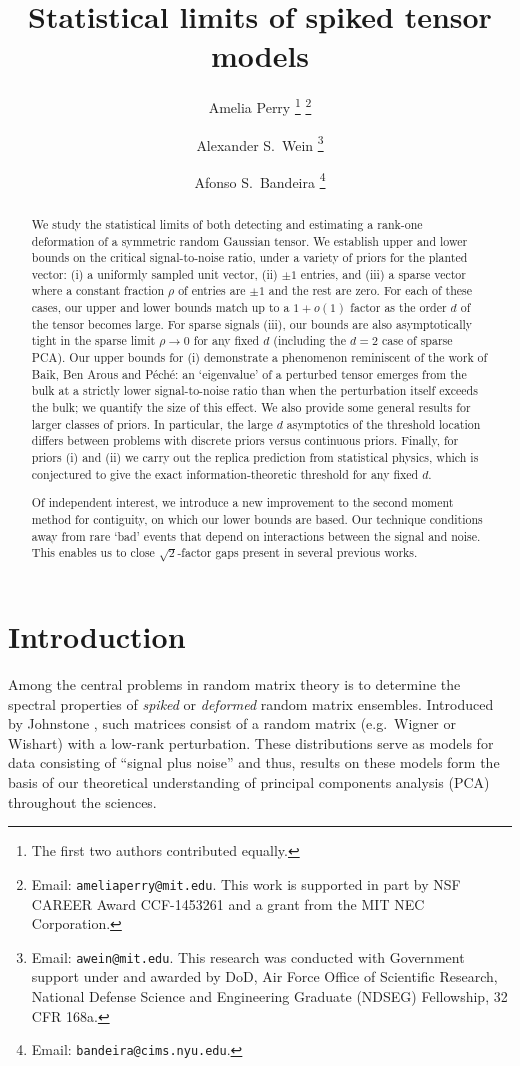 \documentclass{article}
\title{Statistical limits of spiked tensor models}
\author[1]{Amelia Perry%
\footnote{The first two authors contributed equally.}%
\thanks{Email: {\tt ameliaperry@mit.edu}. This work is supported in part by NSF CAREER Award CCF-1453261 and a grant from the MIT NEC Corporation.}%
}
\author[1]{Alexander S.\ Wein%
\protect\firstauthmark%
\thanks{Email: {\tt awein@mit.edu}. This research was conducted with Government support under and awarded by DoD, Air Force Office of Scientific Research, National Defense Science and Engineering Graduate (NDSEG) Fellowship, 32 CFR 168a.}%
}
\author[2]{Afonso S.\ Bandeira%
\thanks{Email: {\tt bandeira@cims.nyu.edu}.
}}
\affil[1]{Department of Mathematics, Massachusetts Institute of Technology}
\affil[2]{Department of Mathematics and Center for Data Science, Courant Institute of Mathematical Sciences, New York University}
\begin{document}
\maketitle

\begin{abstract}

We study the statistical limits of both detecting and estimating a rank-one deformation of a symmetric random Gaussian tensor. We establish upper and lower bounds on the critical signal-to-noise ratio, under a variety of priors for the planted vector: (i) a uniformly sampled unit vector, (ii) \iid $\pm 1$ entries, and (iii) a sparse vector where a constant fraction $\rho$ of entries are \iid $\pm 1$ and the rest are zero. For each of these cases, our upper and lower bounds match up to a $1+o(1)$ factor as the order $d$ of the tensor becomes large. For sparse signals (iii), our bounds are also asymptotically tight in the sparse limit $\rho \to 0$ for any fixed $d$ (including the $d=2$ case of sparse PCA). Our upper bounds for (i) demonstrate a phenomenon reminiscent of the work of Baik, Ben Arous and P\'ech\'e: an `eigenvalue' of a perturbed tensor emerges from the bulk at a strictly lower signal-to-noise ratio than when the perturbation itself exceeds the bulk; we quantify the size of this effect. We also provide some general results for larger classes of priors. In particular, the large $d$ asymptotics of the threshold location differs between problems with discrete priors versus continuous priors. Finally, for priors (i) and (ii) we carry out the replica prediction from statistical physics, which is conjectured to give the exact information-theoretic threshold for any fixed $d$.

Of independent interest, we introduce a new improvement to the second moment method for contiguity, on which our lower bounds are based. Our technique conditions away from rare `bad' events that depend on interactions between the signal and noise. This enables us to close $\sqrt{2}$-factor gaps present in several previous works.

\end{abstract}




\vspace{0.1em}

\section{Introduction}

Among the central problems in random matrix theory is to determine the spectral properties of \emph{spiked} or \emph{deformed} random matrix ensembles. Introduced by Johnstone \cite{johnstone}, such matrices consist of a random matrix (e.g.\ Wigner or Wishart) with a low-rank perturbation. These distributions serve as models for data consisting of ``signal plus noise'' and thus, results on these models form the basis of our theoretical understanding of principal components analysis (PCA) throughout the sciences.
\end{document}
